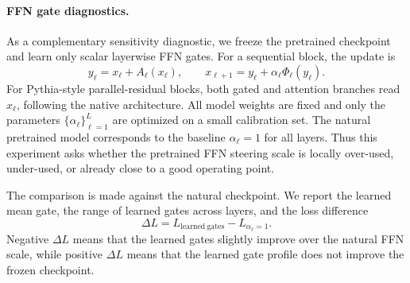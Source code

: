 \documentclass[11pt]{article}
\begin{document}

\paragraph{FFN gate diagnostics.}
As a complementary sensitivity diagnostic, we freeze the pretrained checkpoint
and learn only scalar layerwise FFN gates. For a sequential block, the update is
\begin{equation}
y_\ell=x_\ell+A_\ell(x_\ell),
\qquad
x_{\ell+1}=y_\ell+\alpha_\ell\Phi_\ell(y_\ell).
\end{equation}
For Pythia-style parallel-residual blocks, both gated and attention branches read
$x_\ell$, following the native architecture. All model weights are fixed and only
the parameters
$\{\alpha_\ell\}_{\ell=1}^L$ are optimized on a small calibration set. The
natural pretrained model corresponds to the baseline $\alpha_\ell=1$ for all
layers. Thus this experiment asks whether the pretrained FFN steering scale is
locally over-used, under-used, or already close to a good operating point.

The comparison is made against the natural checkpoint. We report the learned
mean gate, the range of learned gates across layers, and the loss difference
\begin{equation}
\Delta L
=
L_{\mathrm{learned\ gates}}
-
L_{\alpha_\ell=1}.
\end{equation}
Negative $\Delta L$ means that the learned gates slightly improve over the
natural FFN scale, while positive $\Delta L$ means that the learned gate profile
does not improve the frozen checkpoint.
\end{document}
